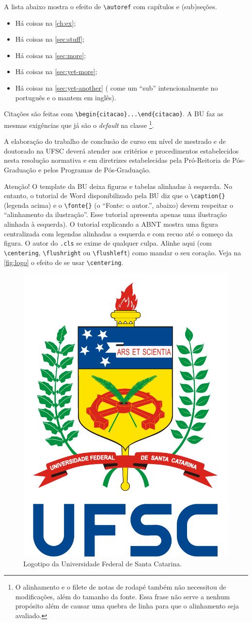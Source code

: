 \documentclass[embeddedlogo]{ufsc-thesis-rn46-2019}
\newcommand{\lacmd}[1]{\texttt{\textbackslash{}#1}}
\newcommand{\laenv}[1]{\texttt{\textbackslash{}begin\{#1\}...\textbackslash{}end\{#1\}}}
\begin{document}
A lista abaixo mostra o efeito de \lacmd{autoref{}} com capítulos e (sub)seções.

\begin{itemize}
\item Há coisas na \autoref{ch:ex};
\item Há coisas na \autoref{sec:stuff};
\item Há coisas na \autoref{sec:more};
\item Há coisas na \autoref{sec:yet-more};
\item Há coisas na \autoref{sec:yet-another} (\abnTeX{} come um ``sub''
  intencionalmente no português e o mantem em inglês).
\end{itemize}

Citações são feitas com \laenv{citacao}. A BU faz as mesmas exigências que já
são o \textit{default} na classe \abnTeX\footnote{O alinhamento e o filete de
  notas de rodapé também não necessitou de modificações, além do tamanho da
  fonte. Essa frase não serve a nenhum propósito além de causar uma quebra de
  linha para que o alinhamento seja avaliado.}.

\begin{citacao}
  A elaboração do trabalho de conclusão de curso em nível de mestrado
  e de doutorado na UFSC deverá atender aos critérios e procedimentos
  estabelecidos nesta resolução normativa e em diretrizes
  estabelecidas pela Pró-Reitoria de Pós-Graduação e pelos Programas
  de Pós-Graduação.
\end{citacao}

Atenção! O template da BU deixa figuras e tabelas alinhadas à esquerda. No
entanto, o tutorial de Word disponibilizado pela BU diz que o \lacmd{caption\{\}}
(legenda acima) e o \lacmd{fonte\{\}} (o ``Fonte: o autor.'', abaixo) devem
respeitar o ``alinhamento da ilustração''. Esse tutorial apresenta apenas uma
ilustração alinhada à esquerda). O tutorial explicando a ABNT mostra uma figura
centralizada com legendas alinhadas a esquerda e com recuo até o começo da
figura. O autor do \texttt{.cls} se exime de qualquer culpa. Alinhe aqui (com
\lacmd{centering}, \lacmd{flushright} ou \lacmd{flushleft}) como mandar o seu
coração. Veja na \autoref{fig:logo} o efeito de se usar \lacmd{centering}.

\begin{figure}[t]
  \centering
  \caption{Logotipo da Universidade Federal de Santa Catarina.}
  \label{fig:logo}

  \includegraphics[width=.2\linewidth]{../logo-ufsc.pdf}
\end{figure}
\end{document}
